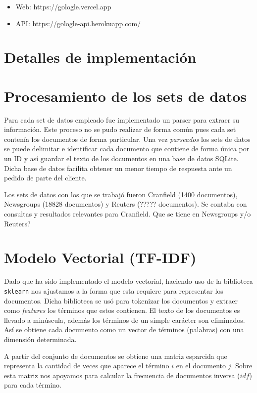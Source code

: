 \documentclass[12pt]{llncs}
\begin{document}
\begin{itemize}
  \item Web: https://gologle.vercel.app
  \item API: https://gologle-api.herokuapp.com/
\end{itemize}

\section*{Detalles de implementación}

\section{Procesamiento de los sets de datos}

Para cada set de datos empleado fue implementado un parser para extraer su información. Este proceso no se pudo realizar de forma común pues cada set contenía los documentos de forma particular. Una vez \textit{parseados} los sets de datos se puede delimitar e identificar cada documento que contiene de forma única por un ID y así guardar el texto de los documentos en una base de datos SQLite. Dicha base de datos facilita obtener un menor tiempo de respuesta ante un pedido de parte del cliente.

Los sets de datos con los que se trabajó fueron Cranfield (1400 documentos), Newsgroups (18828 documentos) y Reuters (????? documentos). Se contaba con consultas y resultados relevantes para Cranfield. {\color{red}Que se tiene en Newsgroups y/o Reuters?}

\section{Modelo Vectorial (TF-IDF)}

Dado que ha sido implementado el modelo vectorial, haciendo uso de la biblioteca \verb+sklearn+ nos ajustamos a la forma que esta requiere para representar los documentos. Dicha biblioteca se usó para tokenizar los documentos y extraer como \textit{features} los términos que estos contienen. El texto de los documentos es llevado a minúscula, además los términos de un simple carácter son eliminados. Así se obtiene cada documento como un vector de términos (palabras) con una dimensión determinada.

A partir del conjunto de documentos se obtiene una matriz esparcida que representa la cantidad de veces que aparece el término $i$ en el documento $j$. Sobre esta matriz nos apoyamos para calcular la frecuencia de documentos inversa ($idf$) para cada término.
\end{document}
